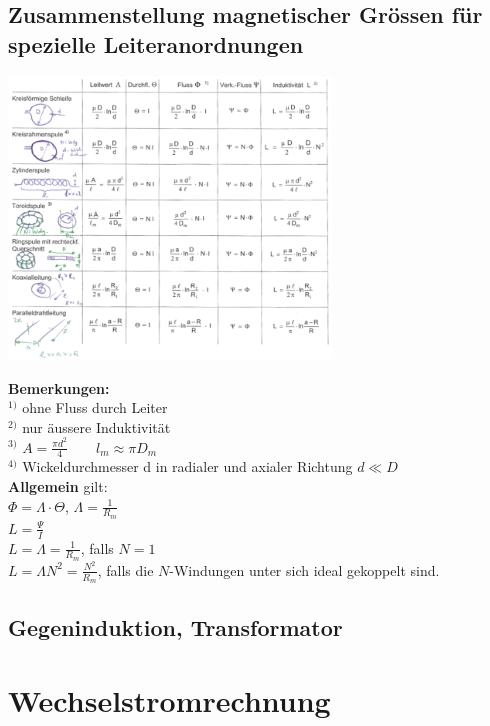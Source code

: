 \subsection{Zusammenstellung magnetischer Grössen für spezielle
Leiteranordnungen}
\begin{minipage}{9cm}
	\includegraphics[height=7.5cm]{./bilder/magnetismus_spez_leiteranordnungen.png} 
\end{minipage}
\begin{minipage}[ht]{10cm}
	\textbf{Bemerkungen:}\\
	$^{1)}$ ohne Fluss durch Leiter\\
	$^{2)}$ nur äussere Induktivität\\
	$^{3)}$ $A=\frac{\pi d^2}{4} \qquad l_m \approx \pi D_m$\\
	$^{4)}$ Wickeldurchmesser d in radialer und axialer Richtung $d \ll D$\\
	
	\textbf{Allgemein} gilt:\\
	$\Phi=\Lambda \cdot \Theta$, $\Lambda=\frac{1}{R_m}$\\
	$L=\frac{\Psi}{I}$\\
	$L=\Lambda=\frac{1}{R_m}$, falls $N=1$\\
	$L=\Lambda N^2=\frac{N^2}{R_m}$, falls die $N$-Windungen unter sich ideal
	gekoppelt sind.
\end{minipage}

\subsection{Gegeninduktion, Transformator}

\newpage

\section{Wechselstromrechnung}
